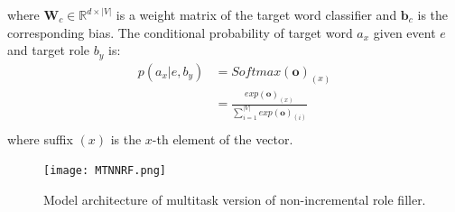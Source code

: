 \documentclass[a4paper]{article}
\begin{document}
where $\mathbf{W}_c\in \mathbb{R}^{d \times |V|}$ is a weight matrix of the target word classifier and $\mathbf{b}_c$ is the corresponding bias. The conditional probability of target word $a_x$ given event $e$ and target role $b_y$ is:
\begin{equation} \label{eq:softmax}
\begin{aligned}
    p(a_x | e, b_y)
        &= Softmax(\mathbf{o})_{(x)} \\
        &= \frac{
        exp(\mathbf{o})_{(x)}
        }{
        \sum_{i=1}^{|V|} exp(\mathbf{o})_{(i)} }   \\
\end{aligned}
\end{equation}
where suffix $(x)$ is the $x$-th element of the vector. 


\begin{figure}[t]
\centering
\texttt{[image: MTNNRF.png]}
\caption{\label{fig:MTNNRF} Model architecture of multitask version of non-incremental role filler.}
\end{figure}
\end{document}
